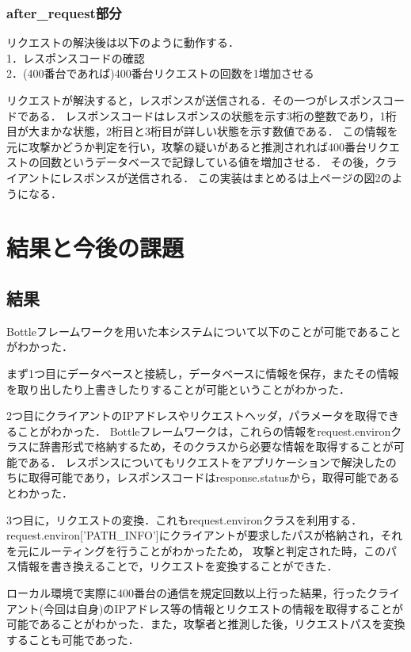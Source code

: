 \documentclass{css}
\begin{document}
\subsubsection{after\_request部分}
リクエストの解決後は以下のように動作する．\\
1．レスポンスコードの確認\\
2．(400番台であれば)400番台リクエストの回数を1増加させる\par
リクエストが解決すると，レスポンスが送信される．その一つがレスポンスコードである．
レスポンスコードはレスポンスの状態を示す3桁の整数であり，1桁目が大まかな状態，2桁目と3桁目が詳しい状態を示す数値である．
この情報を元に攻撃かどうか判定を行い，攻撃の疑いがあると推測されれば400番台リクエストの回数というデータベースで記録している値を増加させる．
その後，クライアントにレスポンスが送信される．
この実装はまとめるは上ページの図2のようになる．

\section{結果と今後の課題}
\subsection{結果}
Bottleフレームワークを用いた本システムについて以下のことが可能であることがわかった．
\par
まず1つ目にデータベースと接続し，データベースに情報を保存，またその情報を取り出したり上書きしたりすることが可能ということがわかった．\par
2つ目にクライアントのIPアドレスやリクエストヘッダ，パラメータを取得できることがわかった．
Bottleフレームワークは，これらの情報をrequest.environクラスに辞書形式で格納するため，そのクラスから必要な情報を取得することが可能である．
レスポンスについてもリクエストをアプリケーションで解決したのちに取得可能であり，レスポンスコードはresponse.statusから，取得可能であるとわかった．\par
3つ目に，リクエストの変換．これもrequest.environクラスを利用する．request.environ['PATH\_INFO']にクライアントが要求したパスが格納され，それを元にルーティングを行うことがわかったため，
攻撃と判定された時，このパス情報を書き換えることで，リクエストを変換することができた．\par
ローカル環境で実際に400番台の通信を規定回数以上行った結果，行ったクライアント(今回は自身)のIPアドレス等の情報とリクエストの情報を取得することが可能であることがわかった．また，攻撃者と推測した後，リクエストパスを変換することも可能であった．
\end{document}

